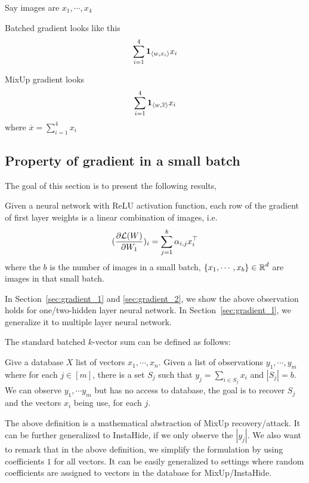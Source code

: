 Say images are $x_1, \cdots, x_4$

Batched gradient looks like this
\begin{align*}
    \sum_{i=1}^4 {\bf 1}_{\langle w, x_i \rangle } x_i
\end{align*}

MixUp gradient looks 
\begin{align*}
    \sum_{i=1}^4 {\bf 1}_{\langle w, \overline{x} \rangle } x_i
\end{align*}
where $\overline{x} = \sum_{i=1}^4 x_i $
\fi

\subsection{Property of gradient in a small batch}\label{sec:gradient}

The goal of this section is to present the following results,
\begin{lemma}\label{lem:main_gradient}
Given a neural network with ReLU activation function, each row of the gradient of first layer weights is a linear combination of images, i.e.
\begin{align*}
    ( \frac{\partial {\cal L}(W)} { \partial W_1 } )_i = \sum_{j=1}^b \alpha_{i,j} x_i^\top 
\end{align*}
where the $b$ is the number of images in a small batch, $\{x_1, \cdots, x_b \} \in \operatorname{{\mathbb R}}^d$ are images in that small batch. 
\end{lemma}
In Section~\ref{sec:gradient_1} and \ref{sec:gradient_2}, we show the above observation holds for one/two-hidden layer neural network. In Section~\ref{sec:gradient_l}, we generalize it to multiple layer neural network.

The standard batched $k$-vector sum can be defined as follows:
\begin{definition}
Give a database $X$ list of vectors $x_1, \cdots, x_n$. Given a list of observations $y_1, \cdots, y_m$ where for each $j \in [m]$, there is a set $S_j$ such that $y_j = \sum_{i \in S_j} x_i$ 
and $|S_j|=b$. We can observe $y_1, \cdots y_m$ but has no access to database, the goal is to recover $S_j$ and the vectors $x_i$ being use, for each $j$.
\end{definition}
The above definition is a mathematical abstraction of MixUp recovery/attack. It can be further generalized to InstaHide, if we only observe the $|y_j|$. We also want to remark that in the above definition, we simplify the formulation by using coefficients $1$ for all vectors. It can be easily generalized to 
settings where random coefficients are assigned to vectors in the database for MixUp/InstaHide. 

